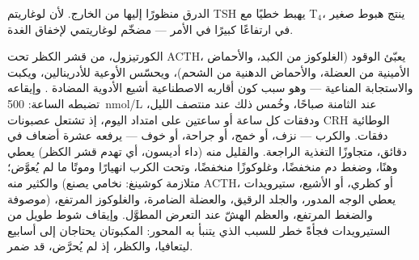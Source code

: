 \begin{omfigure}

{\small {} الدرق منظورًا إليها من الخارج. لأن لوغاريتم
TSH يهبط خطيًا مع T$_4$، ينتج هبوط صغير في  ارتفاعًا
كبيرًا في الأمر ---  مضخّم لوغاريتمي لإخفاق الغدة.}
\end{omfigure}

\begin{example}\label{ex:b3:endocrinology:cortisol}
الكورتيزول، من قشر الكظر تحت ACTH، يعبّئ الوقود (الغلوكوز من
الكبد، والأحماض الأمينية من العضلة، والأحماض الدهنية من
الشحم)، ويحسّس الأوعية للأدرينالين، ويكبت  والاستجابة
المناعية --- وهو سبب كون أقاربه الاصطناعية أشيع الأدوية
المضادة . وإيقاعه تضبطه الساعة: \qty{500}{nmol/L}
عند الثامنة صباحًا، وخُمس ذلك عند منتصف الليل، ودفقات كل
ساعة أو ساعتين على امتداد اليوم، إذ تشتعل عصبونات CRH
الوطائية دفقات. والكرب --- نزف، أو خمج، أو جراحة، أو خوف ---
يرفعه عشرة أضعاف في دقائق، متجاوزًا التغذية الراجعة. والقليل
منه (داء أديسون، أي تهدم قشر الكظر) يعطي وهنًا، وضغط دم
منخفضًا، وغلوكوزًا منخفضًا، وتحت الكرب انهيارًا وموتًا ما
لم يُعوَّض؛ والكثير منه (متلازمة كوشينغ:  نخامي يصنع
ACTH، أو  كظري، أو الأشيع، ستيرويدات موصوفة) يعطي الوجه
المدور، والجلد الرقيق، والعضلة الضامرة، والغلوكوز المرتفع،
والضغط المرتفع، والعظم الهشّ عند التعرض المطوَّل. وإيقاف شوط
طويل من الستيرويدات فجأةً خطر للسبب الذي يتنبأ به المحور:
  المكبوتان يحتاجان إلى أسابيع ليتعافيا،
والكظر، إذ لم يُحرَّض، قد ضمر.
\end{example}

